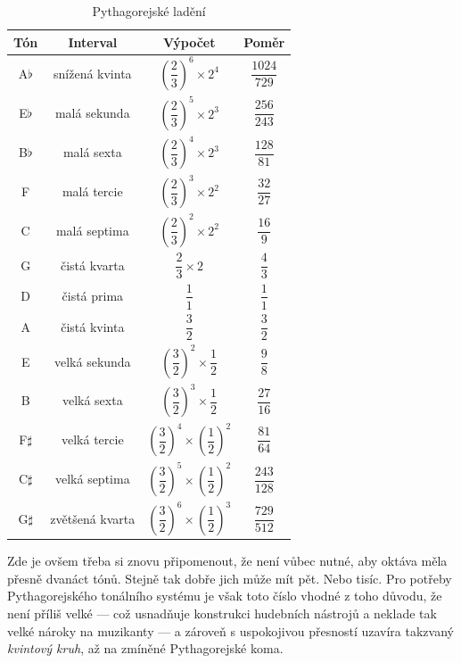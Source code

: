 \documentclass[12pt]{article}
\begin{document}
\begin{table}[p]\centering
	\begin{tabular}{c c c c}
		\textbf{Tón} & \textbf{Interval} & \textbf{Výpočet} & \textbf{Poměr} \\ \hline
		A$\flat$ & snížená kvinta & $\left(\dfrac{2}{3}\right)^6 \times 2^4$ & $\dfrac{1024}{729}$ \\
		E$\flat$ & malá sekunda & $\left(\dfrac{2}{3}\right)^5 \times 2^3$ & $\dfrac{256}{243}$ \\
		B$\flat$ & malá sexta & $\left(\dfrac{2}{3}\right)^4 \times 2^3$ & $\dfrac{128}{81}$ \\
		F & malá tercie & $\left(\dfrac{2}{3}\right)^3 \times 2^2$ & $\dfrac{32}{27}$ \\
		C & malá septima & $\left(\dfrac{2}{3}\right)^2 \times 2^2$ & $\dfrac{16}{9}$ \\
		G & čistá kvarta & $\dfrac{2}{3} \times 2$ & $\dfrac{4}{3}$ \\
		D & čistá prima & $\dfrac{1}{1}$ & $\dfrac{1}{1}$ \\
		A & čistá kvinta & $\dfrac{3}{2}$ & $\dfrac{3}{2}$ \\
		E & velká sekunda & $\left(\dfrac{3}{2}\right)^2 \times \dfrac{1}{2}$ & $\dfrac{9}{8}$ \\
		B & velká sexta & $\left(\dfrac{3}{2}\right)^3 \times \dfrac{1}{2}$ & $\dfrac{27}{16}$ \\
		F$\sharp$ & velká tercie & $\left(\dfrac{3}{2}\right)^4 \times \left(\dfrac{1}{2}\right)^2$ & $\dfrac{81}{64}$ \\
		C$\sharp$ & velká septima & $\left(\dfrac{3}{2}\right)^5 \times \left(\dfrac{1}{2}\right)^2$ & $\dfrac{243}{128}$ \\
		G$\sharp$ & zvětšená kvarta & $\left(\dfrac{3}{2}\right)^6 \times \left(\dfrac{1}{2}\right)^3$ & $\dfrac{729}{512}$ \\
	\end{tabular}
	\caption{Pythagorejské ladění}
	\label{tbl:pythagorean}
\end{table}

Zde je ovšem třeba si znovu připomenout, že není vůbec nutné, aby oktáva měla přesně dvanáct tónů. Stejně tak dobře jich může mít pět. Nebo tisíc. Pro potřeby Pythagorejského tonálního systému je však toto číslo vhodné z toho důvodu, že není příliš velké — což usnadňuje konstrukci hudebních nástrojů a neklade tak velké nároky na muzikanty — a zároveň s uspokojivou přesností uzavíra takzvaný \emph{kvintový kruh}, až na zmíněné Pythagorejské koma.
\end{document}
